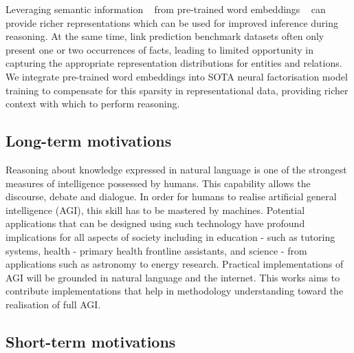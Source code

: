 \noindent Leveraging semantic information \unskip~\citep{NIPS2013_5028} from pre-trained word embeddings \unskip~\citep{mikolov2013distributed} can provide richer representations which can be used for improved inference during reasoning. At the same time, link prediction benchmark datasets often only present one or two occurrences of facts, leading to limited opportunity in capturing the appropriate representation distributions for entities and relations. We integrate pre-trained word embeddings into SOTA neural factorisation model training to compensate for this sparsity in representational data, providing richer context with which to perform reasoning. 

\subsection{Long-term motivations} 

Reasoning about knowledge expressed in natural language is one of the strongest measures of intelligence possessed by humans. This capability allows the discourse, debate and dialogue. In order for humans to realise artificial general intelligence (AGI), this skill has to be mastered by machines. Potential applications that can be designed using such technology have profound implications for all aspects of society including in education - such as tutoring systems, health - primary health frontline assistants, and science - from applications such as astronomy to energy research. Practical implementations of AGI will be grounded in natural language and the internet. This works aims to contribute implementations that help in methodology understanding toward the realisation of full AGI.  

\subsection{Short-term motivations}

